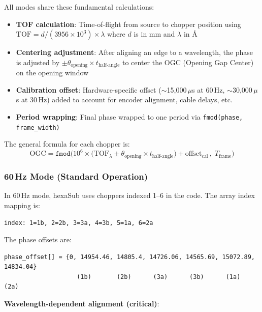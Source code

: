 \documentclass[tm]{ornltm}
\begin{document}
All modes share these fundamental calculations:

\begin{itemize}
    \item \textbf{TOF calculation}: Time-of-flight from source to chopper position using $\text{TOF} = d / (3956 \times 10^3) \times \lambda$ where $d$ is in mm and $\lambda$ in \AA{}
    
    \item \textbf{Centering adjustment}: After aligning an edge to a wavelength, the phase is adjusted by $\pm \theta_{\text{opening}} \times t_{\text{half-angle}}$ to center the OGC (Opening Gap Center) on the opening window
    
    \item \textbf{Calibration offset}: Hardware-specific offset ($\sim$15,000\,$\mu$s at 60\,Hz, $\sim$30,000\,$\mu$s at 30\,Hz) added to account for encoder alignment, cable delays, etc.
    
    \item \textbf{Period wrapping}: Final phase wrapped to one period via \texttt{fmod(phase, frame\_width)}
\end{itemize}

The general formula for each chopper is:
\begin{equation}
\text{OGC} = \texttt{fmod}\Big( 10^6 \times \big( \text{TOF}_\lambda \pm \theta_{\text{opening}} \times t_{\text{half-angle}} \big) + \text{offset}_{\text{cal}} \,,\; T_{\text{frame}} \Big)
\end{equation}

\subsubsection{60\,Hz Mode (Standard Operation)}

In 60\,Hz mode, hexaSub uses choppers indexed 1--6 in the code. The array index mapping is:

\begin{center}
\texttt{index: 1=1b, 2=2b, 3=3a, 4=3b, 5=1a, 6=2a}
\end{center}

The phase offsets are:

\begin{verbatim}
phase_offset[] = {0, 14954.46, 14805.4, 14726.06, 14565.69, 15072.89, 14834.04}
                    (1b)       (2b)      (3a)      (3b)      (1a)      (2a)
\end{verbatim}

\textbf{Wavelength-dependent alignment (critical)}:
\end{document}
